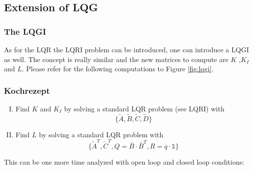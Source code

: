 \documentclass[a4paper,12 pt]{article}
\numberwithin{equation}{section}
\theoremstyle{definition}
\theoremstyle{remark}
\theoremstyle{definition}
\theoremstyle{definition}
\theoremstyle{definition}
\theoremstyle{remark}
\begin{document}
\subsection{Extension of LQG}
\subsubsection{The LQGI}
As for the LQR the LQRI problem can be introduced, one can introduce a LQGI as well. The concept is really similar and the new matrices to compute are $K$ ,$K_I$ and $L$.
Please refer for the following computations to Figure \ref{fig:lqgi}.

\subsubsection*{Kochrezept}
\begin{enumerate}[(I)]
\item Find $K$ and $K_I$ by solving a standard LQR problem (see LQRI) with 
\begin{equation}
\{ \tilde{A},\tilde{B},\tilde{C},\tilde{D}\}
\end{equation}
\item Find $L$ by solving a standard LQR problem with
\begin{equation}
\{ \tilde{A}^T,\tilde{C}^T,Q=\bar{B}\cdot \bar{B}^T,R=q\cdot \mathbb{1}\}
\end{equation}
\end{enumerate}
This can be one more time analyzed with open loop and closed loop conditions:
\end{document}
